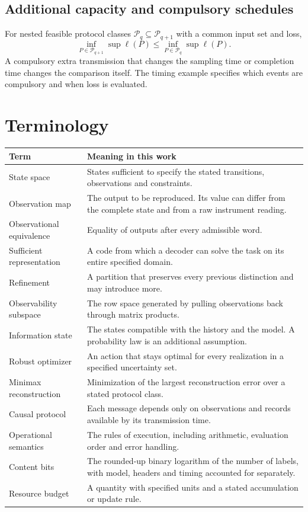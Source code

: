 \subsection{Additional capacity and compulsory schedules}
For nested feasible protocol classes $\mathcal P_q\subseteq\mathcal P_{q+1}$ with a common input set and loss,
\[
 \inf_{P\in\mathcal P_{q+1}}\sup\ell(P)
 \le\inf_{P\in\mathcal P_q}\sup\ell(P).
\]
A compulsory extra transmission that changes the sampling time or completion time changes the comparison itself. The timing example specifies which events are compulsory and when loss is evaluated.

\section{Terminology}
\begin{longtable}{p{}p{}}
\toprule Term & Meaning in this work\\\midrule\endhead
State space & States sufficient to specify the stated transitions, observations and constraints.\\
Observation map & The output to be reproduced. Its value can differ from the complete state and from a raw instrument reading.\\
Observational equivalence & Equality of outputs after every admissible word.\\
Sufficient representation & A code from which a decoder can solve the task on its entire specified domain.\\
Refinement & A partition that preserves every previous distinction and may introduce more.\\
Observability subspace & The row space generated by pulling observations back through matrix products.\\
Information state & The states compatible with the history and the model. A probability law is an additional assumption.\\
Robust optimizer & An action that stays optimal for every realization in a specified uncertainty set.\\
Minimax reconstruction & Minimization of the largest reconstruction error over a stated protocol class.\\
Causal protocol & Each message depends only on observations and records available by its transmission time.\\
Operational semantics & The rules of execution, including arithmetic, evaluation order and error handling.\\
Content bits & The rounded-up binary logarithm of the number of labels, with model, headers and timing accounted for separately.\\
Resource budget & A quantity with specified units and a stated accumulation or update rule.\\
\bottomrule
\end{longtable}
